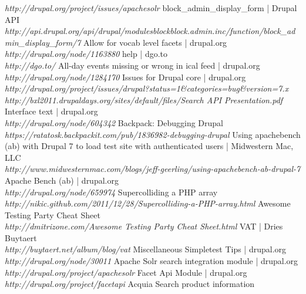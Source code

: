 \begin{thebibliography}{99}
		\emph{http://drupal.org/project/issues/apachesolr}
		block\_admin\_display\_form | Drupal API\\
		\emph{http://api.drupal.org/api/drupal/modules\-\-block\-\-block.admin.inc/function/block\_admin\_display\_form/7}
		Allow for vocab level facets | drupal.org\\
		\emph{http://drupal.org/node/1163880}
		help | dgo.to\\
		\emph{http://dgo.to/}
		All-day events missing or wrong in ical feed | drupal.org\\
		\emph{http://drupal.org/node/1284170}
		Issues for Drupal core | drupal.org\\
		\emph{http://drupal.org/project/issues/drupal?status=1\&categories=bug\&version=7.x}
		\emph{http://bxl2011.drupaldays.org/sites/default/files/Search API Presentation.pdf}
		Interface text | drupal.org\\
		\emph{http://drupal.org/node/604342}
		Backpack: Debugging Drupal\\
		\emph{https://ratatosk.backpackit.com/pub/1836982-debugging-drupal}
		Using apachebench (ab) with Drupal 7 to load test site with authenticated users | Midwestern Mac, LLC \\
		\emph{http://www.midwesternmac.com/blogs/jeff-geerling/using-apachebench-ab-drupal-7}
		Apache Bench (ab) | drupal.org\\
		\emph{http://drupal.org/node/659974}
		Supercolliding a PHP array\\
		\emph{http://nikic.github.com/2011/12/28/Supercolliding-a-PHP-array.html}
		Awesome Testing Party Cheat Sheet\\
		\emph{http://dmitrizone.com/Awesome Testing Party Cheat Sheet.html}
		VAT | Dries Buytaert\\
		\emph{http://buytaert.net/album/blog/vat}
		Miscellaneous Simpletest Tips | drupal.org\\
		\emph{http://drupal.org/node/30011}
		Apache Solr search integration module | drupal.org\\
		\emph{http://drupal.org/project/apachesolr}
		Facet Api Module |  drupal.org\\
		\emph{http://drupal.org/project/facetapi}
		Acquia Search product information\\

\end{thebibliography}

